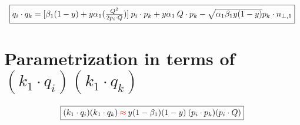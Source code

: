 \begin{equation}
	\begin{aligned}
		\fbox{$  q_i \cdot q_k = [\beta_1 (1-y)+y\alpha_1(\frac{Q^2}{2p_i \cdot Q})]\:p_i \cdot p_k+y\alpha_1\:Q\cdot p_k-\sqrt{\alpha_1\beta_1y(1-y)} p_k \cdot {n_{\bot,1}} $}
    \end{aligned}
\end{equation}

\section{Parametrization in terms of $ (k_1 \cdot q_i )(k_1 \cdot q_k) $}
\begin{equation}
	\begin{aligned}
		\fbox{$  (k_1 \cdot q_i )(k_1 \cdot q_k) {\color[RGB]{255,0,0} \: \approx\:} y(1-\beta_1) (1-y)\:(p_i \cdot p_k)(p_i \cdot Q) $}
    \end{aligned}
\end{equation}

